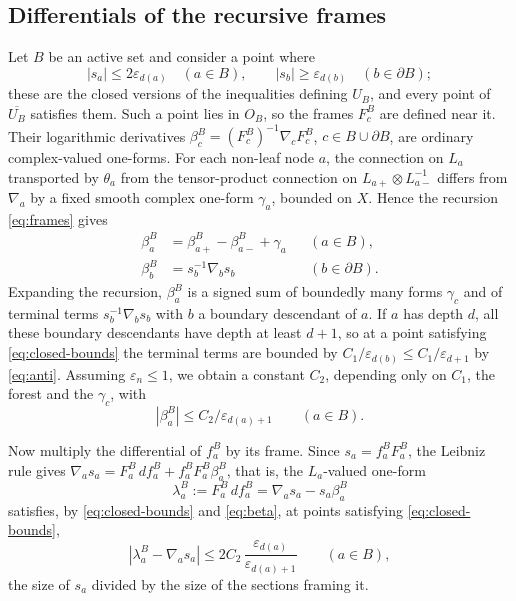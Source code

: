 \documentclass[11pt]{article}
\theoremstyle{remark}
\newcommand{\eps}{\varepsilon}
\begin{document}
\subsection*{Differentials of the recursive frames}
Let $B$ be an active set and consider a point where
\begin{equation}\label{eq:closed-bounds}
 |s_a|\le2\eps_{d(a)}\quad(a\in B),\qquad
 |s_b|\ge\eps_{d(b)}\quad(b\in\partial B);
\end{equation}
these are the closed versions of the inequalities defining $U_B$, and
every point of $\overline{U_B}$ satisfies them. Such a point lies in
$O_B$, so the frames $F^B_c$ are defined near it. Their logarithmic
derivatives $\beta^B_c=(F^B_c)^{-1}\nabla_cF^B_c$, $c\in B\cup\partial B$,
are ordinary complex-valued one-forms. For each non-leaf node $a$, the
connection on $L_a$ transported by $\theta_a$ from the tensor-product
connection on $L_{a+}\otimes L_{a-}^{-1}$ differs from $\nabla_a$ by a
fixed smooth complex one-form $\gamma_a$, bounded on $X$. Hence the
recursion \eqref{eq:frames} gives
\begin{align*}
 \beta^B_a&=\beta^B_{a+}-\beta^B_{a-}+\gamma_a &&(a\in B),\\
 \beta^B_b&=s_b^{-1}\nabla_bs_b &&(b\in\partial B).
\end{align*}
Expanding the recursion, $\beta^B_a$ is a signed sum of boundedly many
forms $\gamma_c$ and of terminal terms $s_b^{-1}\nabla_bs_b$ with $b$ a
boundary descendant of $a$. If $a$ has depth $d$, all these boundary
descendants have depth at least $d+1$, so at a point satisfying
\eqref{eq:closed-bounds} the terminal terms are bounded by
$C_1/\eps_{d(b)}\le C_1/\eps_{d+1}$ by \eqref{eq:anti}. Assuming
$\eps_n\le1$, we obtain a constant $C_2$, depending only on $C_1$, the
forest and the $\gamma_c$, with
\begin{equation}\label{eq:beta}
 |\beta^B_a|\le C_2/\eps_{d(a)+1}\qquad(a\in B).
\end{equation}

Now multiply the differential of $f^B_a$ by its frame. Since
$s_a=f^B_aF^B_a$, the Leibniz rule gives
$\nabla_as_a=F^B_a\,df^B_a+f^B_aF^B_a\beta^B_a$, that is, the
$L_a$-valued one-form
\begin{equation}\label{eq:lambda}
 \lambda^B_a:=F^B_a\,df^B_a=\nabla_as_a-s_a\beta^B_a
\end{equation}
satisfies, by \eqref{eq:closed-bounds} and \eqref{eq:beta}, at points
satisfying \eqref{eq:closed-bounds},
\begin{equation}\label{eq:lambda-error}
 |\lambda^B_a-\nabla_as_a|\le2C_2\,\frac{\eps_{d(a)}}{\eps_{d(a)+1}}
 \qquad(a\in B),
\end{equation}
the size of $s_a$ divided by the size of the sections framing it.
\end{document}
